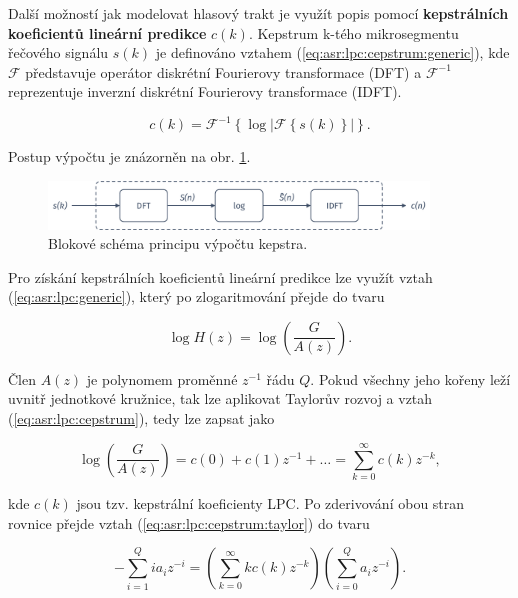 Další možností jak modelovat hlasový trakt je využít popis pomocí \textbf{kepstrálních koeficientů lineární predikce} $c\left(k\right)$. Kepstrum k-tého mikrosegmentu řečového signálu $s\left(k\right)$ je definováno vztahem (\ref{eq:asr:lpc:cepstrum:generic}), kde $\mathcal{F}$ představuje operátor diskrétní Fourierovy transformace (DFT) a $\mathcal{F}^{-1}$ reprezentuje inverzní diskrétní Fourierovy transformace (IDFT).

\begin{equation}
  c(k) = \mathcal{F}^{-1}\left\{\log\left| \mathcal{F}\left\{s(k)\right\} \right|\right\}.
  \label{eq:asr:lpc:cepstrum:generic}
\end{equation}

\noindent Postup výpočtu je znázorněn na obr. \ref{fig:asr:model:speech:cepstrum}.

\begin{figure}[hbpt]
  \centering
  \includegraphics[width=0.9\textwidth]{./ch4-asr/img/cepstrum.pdf}
  \caption{Blokové schéma principu výpočtu kepstra.}
  \label{fig:asr:model:speech:cepstrum}
\end{figure}

Pro získání kepstrálních koeficientů lineární predikce lze využít vztah (\ref{eq:asr:lpc:generic}), který po zlogaritmování přejde do tvaru

\begin{equation}
  \log H(z) = \log \left( \frac{G}{A(z)} \right).
  \label{eq:asr:lpc:cepstrum}
\end{equation}

\noindent Člen $A(z)$ je polynomem proměnné $z^{-1}$ řádu $Q$. Pokud všechny jeho kořeny leží uvnitř jednotkové kružnice, tak lze aplikovat Taylorův rozvoj a vztah (\ref{eq:asr:lpc:cepstrum}), tedy lze zapsat jako

\begin{equation}
  \log \left( \frac{G}{A(z)} \right) = c(0) + c(1)z^{-1} + \dots = \sum_{k=0}^{\infty} c(k)z^{-k},
  \label{eq:asr:lpc:cepstrum:taylor}
\end{equation}

\noindent kde $c(k)$ jsou tzv. kepstrální koeficienty LPC. Po zderivování obou stran rovnice přejde vztah (\ref{eq:asr:lpc:cepstrum:taylor}) do tvaru

\begin{equation}
  - \sum_{i=1}^{Q} ia_iz^{-i} = \left( \sum_{k=0}^{\infty} kc(k)z^{-k} \right)\left( \sum_{i=0}^{Q} a_iz^{-i}\right).
  \label{eq:asr:lpc:cepstrum:deriv}
\end{equation}

